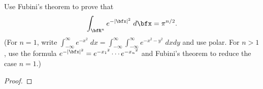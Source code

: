 \begin{problem}
Use Fubini's theorem to prove that
\[
\int_{\bfR^n}e^{-|\bfx|^2}\;d\bfx=\pi^{n/2}.
\]
(For $n=1$, write $\int_{-\infty}^\infty
e^{-x^2}\;dx=\int_{-\infty}^\infty\int_{-\infty}^\infty e^{-x^2-y^2}\;dxdy$
and use polar. For $n>1$, use the formula $e^{-|\bfx|^2}=e^{-{x_1}^2}\cdots
e^{-{x_n}^2}$ and Fubini's theorem to reduce the case $n=1$.)
\end{problem}
\begin{proof}
\end{proof}

